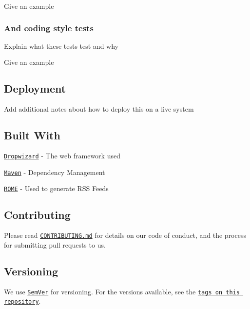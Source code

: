 \begin{DoxyCode}
Give an example
\end{DoxyCode}


\subsubsection*{And coding style tests}

Explain what these tests test and why


\begin{DoxyCode}
Give an example
\end{DoxyCode}


\subsection*{Deployment}

Add additional notes about how to deploy this on a live system

\subsection*{Built With}


\begin{DoxyItemize}
\item \href{http://www.dropwizard.io/1.0.2/docs/}{\tt Dropwizard} -\/ The web framework used
\item \href{https://maven.apache.org/}{\tt Maven} -\/ Dependency Management
\item \href{https://rometools.github.io/rome/}{\tt R\+O\+ME} -\/ Used to generate R\+SS Feeds
\end{DoxyItemize}

\subsection*{Contributing}

Please read \href{https://gist.github.com/PurpleBooth/b24679402957c63ec426}{\tt C\+O\+N\+T\+R\+I\+B\+U\+T\+I\+N\+G.\+md} for details on our code of conduct, and the process for submitting pull requests to us.

\subsection*{Versioning}

We use \href{http://semver.org/}{\tt Sem\+Ver} for versioning. For the versions available, see the \href{https://github.com/your/project/tags}{\tt tags on this repository}.

